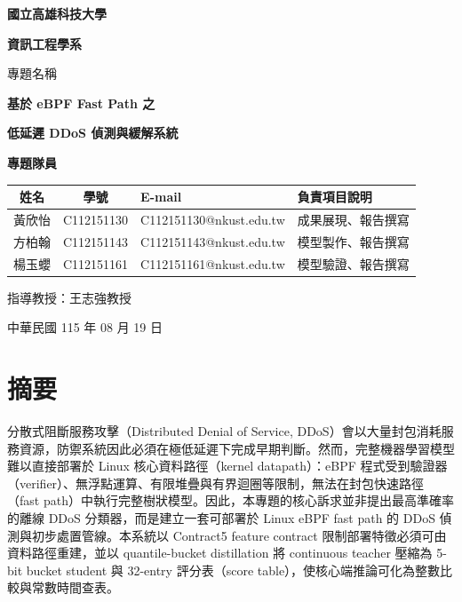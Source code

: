 \documentclass[12pt, a4paper, fontset=none]{ctexart}
\begin{document}
\begin{titlepage}
\centering
\vspace*{2.4cm}
{\Large \textbf{國立高雄科技大學}\par}
\vspace{0.45cm}
{\large \textbf{資訊工程學系}\par}

\vspace{2.4cm}
{\normalsize 專題名稱\par}
\vspace{0.75cm}
{\LARGE \textbf{基於 eBPF Fast Path 之}\par}
\vspace{0.45cm}
{\LARGE \textbf{低延遲 DDoS 偵測與緩解系統}\par}

\vspace{2.6cm}
{\normalsize \textbf{專題隊員}\par}
\vspace{0.45cm}

{\small
\setlength{\tabcolsep}{6pt}
\renewcommand{\arraystretch}{1.35}
\begin{tabular}{|c|c|l|l|}
\hline
\textbf{姓名} & \textbf{學號} & \textbf{E-mail} & \textbf{負責項目說明} \\
\hline
黃欣怡 & C112151130 & C112151130@nkust.edu.tw & 成果展現、報告撰寫 \\
\hline
方柏翰 & C112151143 & C112151143@nkust.edu.tw & 模型製作、報告撰寫 \\
\hline
楊玉蠳 & C112151161 & C112151161@nkust.edu.tw & 模型驗證、報告撰寫 \\
\hline
\end{tabular}
}

\vfill
{\normalsize 指導教授：王志強教授\par}
\vspace{1.1cm}
{\normalsize 中華民國 115 年 08 月 19 日\par}
\end{titlepage}

\newpage
\section*{摘要}
分散式阻斷服務攻擊（Distributed Denial of Service, DDoS）會以大量封包消耗服務資源，防禦系統因此必須在極低延遲下完成早期判斷。然而，完整機器學習模型難以直接部署於 Linux 核心資料路徑（kernel datapath）：eBPF 程式受到驗證器（verifier）、無浮點運算、有限堆疊與有界迴圈等限制，無法在封包快速路徑（fast path）中執行完整樹狀模型。因此，本專題的核心訴求並非提出最高準確率的離線 DDoS 分類器，而是建立一套可部署於 Linux eBPF fast path 的 DDoS 偵測與初步處置管線。本系統以 Contract5 feature contract 限制部署特徵必須可由資料路徑重建，並以 quantile-bucket distillation 將 continuous teacher 壓縮為 5-bit bucket student 與 32-entry 評分表（score table），使核心端推論可化為整數比較與常數時間查表。
\end{document}
